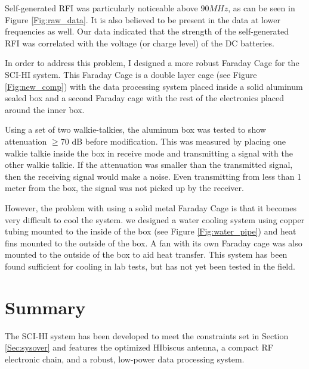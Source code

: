 Self-generated RFI was particularly noticeable above $90 MHz$, as can be seen in Figure \ref{Fig:raw_data}. It is also believed to be present in the data at lower frequencies as well. Our data indicated that the strength of the self-generated RFI was correlated with the voltage (or charge level) of the DC batteries. 

In order to address this problem, I designed a more robust Faraday Cage for the SCI-HI system. This Faraday Cage is a double layer cage (see Figure \ref{Fig:new_comp}) with the data processing system placed inside a solid aluminum sealed box and a second Faraday cage with the rest of the electronics placed around the inner box. 

Using a set of two walkie-talkies, the aluminum box was tested to show attenuation $\geq$70 dB before modification. This was measured by placing one walkie talkie inside the box in receive mode and transmitting a signal with the other walkie talkie. If the attenuation was smaller than the transmitted signal, then the receiving signal would make a noise. Even transmitting from less than 1 meter from the box, the signal was not picked up by the receiver. 

However, the problem with using a solid metal Faraday Cage is that it becomes very difficult to cool the system. we designed a water cooling system using copper tubing mounted to the inside of the box (see Figure \ref{Fig:water_pipe}) and heat fins mounted to the outside of the box. A fan with its own Faraday cage was also mounted to the outside of the box to aid heat transfer. This system has been found sufficient for cooling in lab tests, but has not yet been tested in the field. 



\section{Summary}

The SCI-HI system has been developed to meet the constraints set in Section \ref{Sec:sysover} and features the optimized HIbiscus antenna, a compact RF electronic chain, and a robust, low-power data processing system. 
